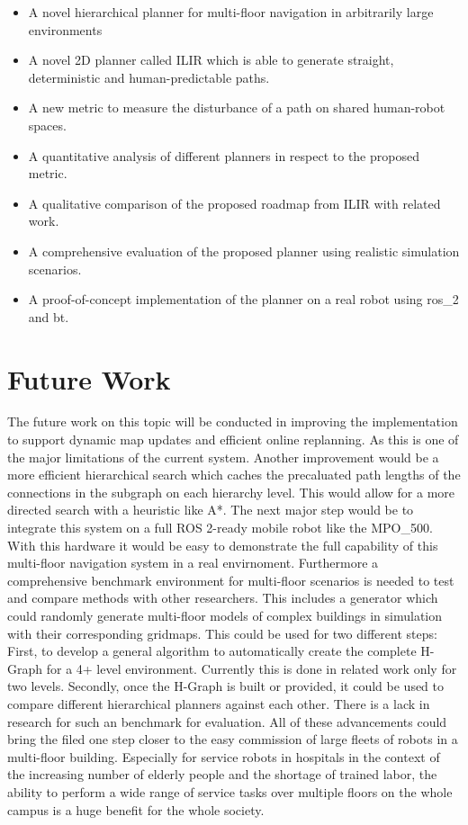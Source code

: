 \begin{itemize}
    \item A novel hierarchical planner for multi-floor navigation in arbitrarily large environments
    \item A novel 2D planner called ILIR which is able to generate straight, deterministic and human-predictable paths.
    \item A new metric to measure the disturbance of a path on shared human-robot spaces.
    \item A quantitative analysis of different planners in respect to the proposed metric.
    \item A qualitative comparison of the proposed roadmap from ILIR with related work.
    \item A comprehensive evaluation of the proposed planner using realistic simulation scenarios.
    \item A proof-of-concept implementation of the planner on a real robot using \gls{ros_2} and \gls{bt}.
\end{itemize}

\section{Future Work}
\label{sec:future_work}

The future work on this topic will be conducted in improving the implementation to support dynamic map updates and efficient online replanning. As this is one of the major limitations of the current system. Another improvement would be a more efficient hierarchical search which caches the precaluated path lengths of the connections in the subgraph on each hierarchy level. This would allow for a more directed search with a heuristic like A*. The next major step would be to integrate this system on a full ROS 2-ready mobile robot like the MPO\_500. With this hardware it would be easy to demonstrate the full capability of this multi-floor navigation system in a real envirnoment. Furthermore a comprehensive benchmark environment for multi-floor scenarios is needed to test and compare methods with other researchers. This includes a generator which could randomly generate multi-floor models of complex buildings in simulation with their corresponding gridmaps. This could be used for two different steps: First, to develop a general algorithm to automatically create the complete H-Graph for a 4+ level environment. Currently this is done in related work only for two levels. Secondly, once the H-Graph is built or provided, it could be used to compare different hierarchical planners against each other. There is a lack in research for such an benchmark for evaluation. All of these advancements could bring the filed one step closer to the easy commission of large fleets of robots in a multi-floor building. Especially for service robots in hospitals in the context of the increasing number of elderly people and the shortage of trained labor, the ability to perform a wide range of service tasks over multiple floors on the whole campus is a huge benefit for the whole society.
